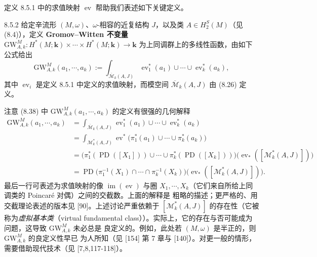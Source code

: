 定义 8.5.1 中的求值映射 $\operatorname{ev}$ 帮助我们表述如下关键定义。

\begin{wdefn}{8.5.2}
给定辛流形 $(M,\omega)$、$\omega$-相容的近复结构 $J$，以及类
$A\in H_2^S(M)$（见 (8.4)），定义 \textbf{Gromov--Witten 不变量}
$\mathrm{GW}^M_{A,k}:H^*(M;\mathbf{k})\times\cdots\times H^*(M;\mathbf{k})\to\mathbf{k}$
为上同调群上的多线性函数，由如下公式给出
\begin{equation}
  \mathrm{GW}^M_{A,k}(a_1,\cdots,a_k)
  :=\int_{\overline{\mathcal{M}}_k(A,J)}\operatorname{ev}_1^*(a_1)\cup\cdots
  \cup\operatorname{ev}_k^*(a_k),
  \tag{8.38}
\end{equation}
其中 $\operatorname{ev}_i$ 是定义 8.5.1 中定义的求值映射，而模空间
$\overline{\mathcal{M}}_k(A,J)$ 由 (8.26) 定义。
\end{wdefn}

注意 (8.38) 中 $\mathrm{GW}^M_{A,k}(a_1,\cdots,a_k)$ 的定义有很强的几何解释
\begin{align*}
  \mathrm{GW}^M_{A,k}(a_1,\cdots,a_k)
  &=\int_{\overline{\mathcal{M}}_k(A,J)}\operatorname{ev}_1^*(a_1)\cup\cdots
    \cup\operatorname{ev}_k^*(a_k)\\
  &=\int_{\mathcal{M}^*_k(A,J)}\operatorname{ev}^*\big(\pi_1^*(a_1)\cup\cdots
    \cup\pi_k^*(a_k)\big)\\
  &=\big(\pi_1^*(\operatorname{PD}([X_1]))\cup\cdots\cup
    \pi_k^*(\operatorname{PD}([X_k]))\big)
    \big(\operatorname{ev}_*([\mathcal{M}^*_k(A,J)])\big)\\
  &=\operatorname{PD}\big(\pi_1^{-1}(X_1)\cap\cdots\cap\pi_k^{-1}(X_k)\big)
    \big(\operatorname{ev}_*([\mathcal{M}^*_k(A,J)])\big).
\end{align*}
最后一行可表述为求值映射的像 $\operatorname{im}(\operatorname{ev})$ 与圈
$X_1,\cdots,X_k$（它们来自所给上同调类的 Poincaré 对偶）之间的交截数。上面的解释是
粗略的描述；更严格的、用交截理论表述的版本见 [90]。上述讨论严重依赖于
$[\mathcal{M}^*_k(A,J)]$ 的存在性（它被称为\emph{虚拟基本类}（virtual fundamental
class））。实际上，它的存在与否可能成为问题，这导致 $\mathrm{GW}^M_{A,k}$ 未必总是
良定义的。例如，此处若 $(M,\omega)$ 是半正的，则 $\mathrm{GW}^M_{A,k}$ 的良定义性早已
为人所知（见 [154] 第 7 章与 [140]）。对更一般的情形，需要借助现代技术（见
[7,8,117-118]）。

